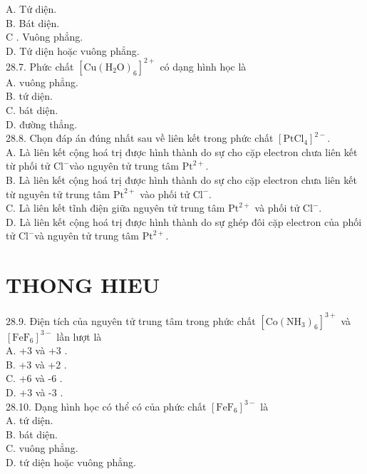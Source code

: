 \documentclass[10pt]{article}
\begin{document}
A. Tứ diện.\\
B. Bát diện.\\
C . Vuông phẳng.\\
D. Tứ diện hoặc vuông phẳng.\\
28.7. Phức chất $\left[\mathrm{Cu}\left(\mathrm{H}_{2} \mathrm{O}\right)_{6}\right]^{2+}$ có dạng hình học là\\
A. vuông phẳng.\\
B. tứ diện.\\
C. bát diện.\\
D. đường thẳng.\\
28.8. Chọn đáp án đúng nhất sau về liên kết trong phức chất $\left[\mathrm{PtCl}_{4}\right]^{2-}$.\\
A. Là liên kết cộng hoá trị được hình thành do sự cho cặp electron chưa liên kết từ phối tử $\mathrm{Cl}^{-}$vào nguyên tử trung tâm $\mathrm{Pt}^{2+}$.\\
B. Là liên kết cộng hoá trị được hình thành do sự cho cặp electron chưa liên kết từ nguyên tử trung tâm $\mathrm{Pt}^{2+}$ vào phối tử $\mathrm{Cl}^{-}$.\\
C. Là liên kết tĩnh điện giữa nguyên tử trung tâm $\mathrm{Pt}^{2+}$ và phối tử $\mathrm{Cl}^{-}$.\\
D. Là liên kết cộng hoá trị được hình thành do sự ghép đôi cặp electron của phối tử $\mathrm{Cl}^{-}$và nguyên tử trung tâm $\mathrm{Pt}^{2+}$.

\section*{THONG HIEU}
28.9. Điện tích của nguyên tử trung tâm trong phức chất $\left[\mathrm{Co}\left(\mathrm{NH}_{3}\right)_{6}\right]^{3+}$ và $\left[\mathrm{FeF}_{6}\right]^{3-}$ lần lượt là\\
A. +3 và +3 .\\
B. +3 và +2 .\\
C. +6 và -6 .\\
D. +3 và -3 .\\
28.10. Dạng hình học có thể có của phức chất $\left[\mathrm{FeF}_{6}\right]^{3-}$ là\\
A. tứ diện.\\
B. bát diện.\\
C. vuông phẳng.\\
D. tứ diện hoặc vuông phẳng.
\end{document}

